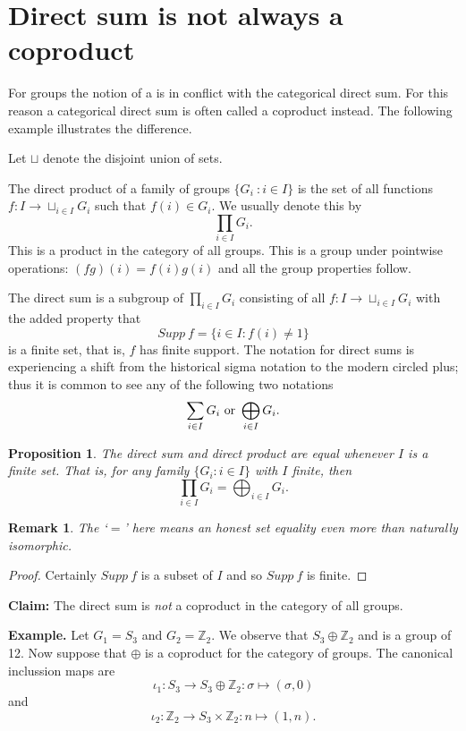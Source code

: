\documentclass[12pt]{article}
\newtheorem{prop}[thm]{Proposition}
\newtheorem{remark}[thm]{Remark}
\begin{document}

\section{Direct sum is not always a coproduct}

For groups the notion of a  is in conflict with the categorical direct  sum.  For this reason a categorical direct sum is often called a coproduct instead.  The following example illustrates the difference.

Let $\sqcup$ denote the disjoint union of sets.

The direct product of a family of groups $\{G_i~:i\in I\}$ is the set of all functions $f:I\rightarrow \sqcup_{i\in I} G_i$ such that $f(i)\in G_i$.  We usually denote this by
    \[\prod_{i\in I} G_i.\]
This is a product in the category of all groups.  This is a group under pointwise operations: $(fg)(i)=f(i)g(i)$ and all the group properties follow.

The direct sum is a subgroup of $\prod_{i\in I} G_i$ consisting of all $f:I\rightarrow \sqcup_{i\in I} G_i$ with the added property that
   \[Supp~f=\{i\in I: f(i)\neq 1\}\]
is a finite set, that is, $f$ has finite support.  The notation for direct
sums is experiencing a shift from the historical sigma notation to the modern
circled plus; thus it is common to see any of the following two notations
  \[\sum_{i\in I} G_i\textnormal{ or } \bigoplus_{i\in I} G_i.\]

\begin{prop}\label{prop:eq}
The direct sum and direct product are equal whenever $I$ is a finite set.
That is, for any family $\{G_i:i\in I\}$ with $I$ finite, then
\[\prod_{i\in I} G_i=\bigoplus_{i\in I} G_i.\]
\end{prop}
\begin{remark}
The `$=$' here means an honest set equality even more than naturally isomorphic.
\end{remark}
\begin{proof}
Certainly $Supp~f$ is a subset of $I$ and so $Supp~f$ is finite.
\end{proof}

\textbf{Claim:} The direct sum is \emph{not} a coproduct in the category of all groups.

\noindent\textbf{Example.}
Let $G_1=S_3$ and $G_2=\mathbb{Z}_2$.  We observe that $S_3\oplus \mathbb{Z}_2$ and is a group of  12.  Now suppose that $\oplus$ is a coproduct for the category of groups.  The canonical inclussion maps are 
\[\iota_1:S_3\rightarrow S_3\oplus \mathbb{Z}_2: \sigma\mapsto (\sigma,0)\]
and 
\[\iota_2:\mathbb{Z}_2\rightarrow S_3\times \mathbb{Z}_2:n\mapsto (1,n).\]
\end{document}
